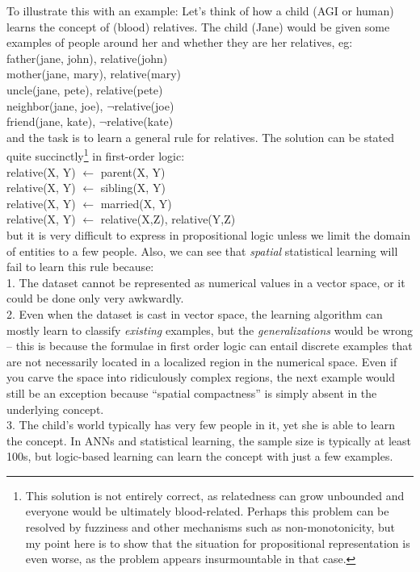 \documentclass[a4paper]{report}
\begin{document}
To illustrate this with an example:  Let's think of how a child (AGI or human) learns the concept of (blood) relatives.  The child (Jane) would be given some examples of people around her and whether they are her relatives, eg:\\
\hspace*{1cm} father(jane, john), relative(john)\\
\hspace*{1cm} mother(jane, mary), relative(mary)\\
\hspace*{1cm} uncle(jane, pete), relative(pete)\\
\hspace*{1cm} neighbor(jane, joe), $\neg$relative(joe)\\
\hspace*{1cm} friend(jane, kate), $\neg$relative(kate)\\
and the task is to learn a general rule for relatives.  The solution can be stated quite succinctly\footnote{This solution is not entirely correct, as relatedness can grow unbounded and everyone would be ultimately blood-related.  Perhaps this problem can be resolved by fuzziness and other mechanisms such as non-monotonicity, but my point here is to show that the situation for propositional representation is even worse, as the problem appears insurmountable in that case.} in first-order logic:\\
\hspace*{1cm} relative(X, Y) $\leftarrow$ parent(X, Y)\\
\hspace*{1cm} relative(X, Y) $\leftarrow$ sibling(X, Y)\\
\hspace*{1cm} relative(X, Y) $\leftarrow$ married(X, Y)\\
\hspace*{1cm} relative(X, Y) $\leftarrow$ relative(X,Z), relative(Y,Z)\\
but it is very difficult to express in propositional logic unless we limit the domain of entities to a few people.  Also, we can see that \textit{spatial} statistical learning will fail to learn this rule because:\\
1. The dataset cannot be represented as numerical values in a vector space, or it could be done only very awkwardly.\\
2. Even when the dataset is cast in vector space, the learning algorithm can mostly learn to classify \textit{existing} examples, but the \textit{generalizations} would be wrong -- this is because the formulae in first order logic can entail discrete examples that are not necessarily located in a localized region in the numerical space.  Even if you carve the space into ridiculously complex regions, the next example would still be an exception because ``spatial compactness'' is simply absent in the underlying concept.\\
3. The child's world typically has very few people in it, yet she is able to learn the concept.  In ANNs and statistical learning, the sample size is typically at least 100s, but logic-based learning can learn the concept with just a few examples.
\end{document}

